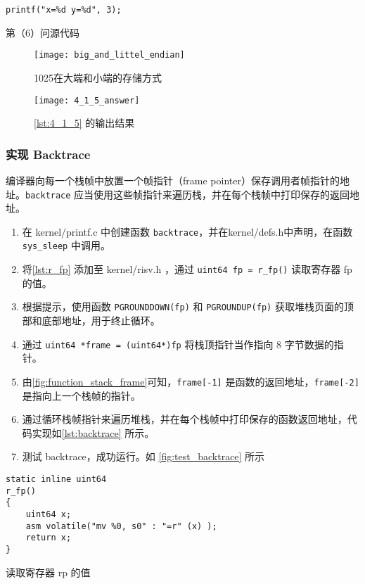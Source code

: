 \begin{listing}[!htb]
	\begin{verbatim}
printf("x=%d y=%d", 3);
	\end{verbatim}
	\caption{第（6）问源代码}\label{lst:4_1_6}
\end{listing}

\begin{figure}[!htb]
	\centering
	\texttt{[image: big\_and\_littel\_endian]}
	\caption{1025在大端和小端的存储方式}
	\label{fig:big_and_littel_endian}
\end{figure}

\begin{figure}[!htb]
	\centering
	\texttt{[image: 4\_1\_5\_answer]}
	\caption{\cref{lst:4_1_5} 的输出结果}
	\label{fig:4_1_5_answer}
\end{figure}

\subsubsection{实现 Backtrace}

编译器向每一个栈帧中放置一个帧指针（frame pointer）保存调用者帧指针的地址。\texttt{backtrace} 应当使用这些帧指针来遍历栈，并在每个栈帧中打印保存的返回地址。

\begin{enumerate}
	\item 在 kernel/printf.c 中创建函数 \texttt{backtrace}，并在kernel/defs.h中声明，在函数 \texttt{sys\_sleep} 中调用。
	\item 将\cref{lst:r_fp} 添加至 kernel/risv.h ，通过 \texttt{uint64 fp = r\_fp()} 读取寄存器 fp 的值。
	\item 根据提示，使用函数 \texttt{PGROUNDDOWN(fp)} 和 \texttt{PGROUNDUP(fp)} 获取堆栈页面的顶部和底部地址，用于终止循环。
	\item 通过 \texttt{uint64 *frame = (uint64*)fp} 将栈顶指针当作指向 8 字节数据的指针。
	\item 由\cref{fig:function_stack_frame}可知，\texttt{frame[-1]} 是函数的返回地址，\texttt{frame[-2]} 是指向上一个栈帧的指针。
	\item 通过循环栈帧指针来遍历堆栈，并在每个栈帧中打印保存的函数返回地址，代码实现如\cref{lst:backtrace} 所示。
	\item 测试 backtrace，成功运行。如 \cref{fig:test_backtrace} 所示
\end{enumerate}

\begin{listing}[!htb]
	\begin{verbatim}
static inline uint64
r_fp()
{
    uint64 x;
    asm volatile("mv %0, s0" : "=r" (x) );
    return x;
}
	\end{verbatim}
	\caption{读取寄存器 rp 的值}\label{lst:r_fp}
\end{listing}


